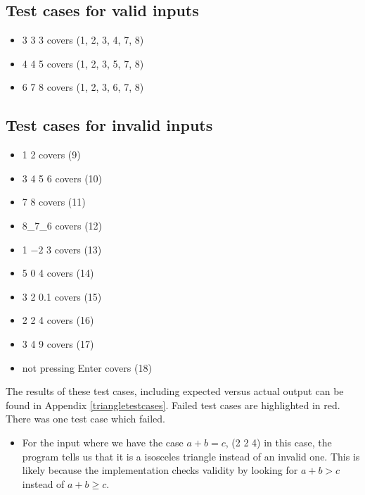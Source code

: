 \documentclass[letterpaper]{article}
\begin{document}
\subsection*{Test cases for valid inputs}
\begin{itemize}
    \item 3 3 3 covers (1, 2, 3, 4, 7, 8)
    \item 4 4 5 covers (1, 2, 3, 5, 7, 8)
    \item 6 7 8 covers (1, 2, 3, 6, 7, 8)
\end{itemize}

\subsection*{Test cases for invalid inputs}
\begin{itemize}
    \item 1 2 covers (9)
    \item 3 4 5 6 covers (10)
    \item 7 8  covers (11)
    \item 8\_7\_6 covers (12)
    \item 1 $-2$ 3 covers (13)
    \item 5 0 4 covers (14)
    \item 3 2 0.1 covers (15)
    \item 2 2 4 covers (16)
    \item 3 4 9 covers (17)
    \item not pressing Enter covers (18)
\end{itemize}

The results of these test cases, including expected versus actual output can be found in Appendix \ref{triangletestcases}.
Failed test cases are highlighted in red. There was one test case which failed. 

\begin{itemize}
    \item For the input where we have the case $a+b=c$,
    (2 2 4) in this case, the program tells us that it is a isosceles triangle instead of an invalid one.
    This is likely because the implementation checks validity by looking for $a+b>c$ instead of $a+b \geq c$.    
\end{itemize}
\end{document}
